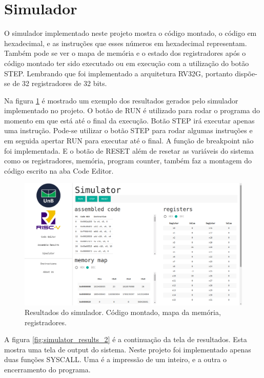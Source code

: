 \section{Simulador}

	O simulador implementado neste projeto mostra o código montado, o código em hexadecimal, e as instruções que esses números em hexadecimal representam. Também pode se ver o mapa de memória e o estado dos registradores após o código montado ter sido executado ou em execução com a utilização do botão STEP.  Lembrando que foi implementado a arquitetura RV32G, portanto dispõe-se de 32 registradores de 32 bits.

	Na figura \ref{fig:simulator_results_1} é mostrado um exemplo dos resultados gerados pelo simulador implementado no projeto. O botão de RUN é utilizado para rodar o programa do momento em que está até o final da execução. Botão STEP irá executar apenas uma instrução. Pode-se utilizar o botão STEP para rodar algumas instruções e em seguida apertar RUN para executar até o final. A função de breakpoint não foi implementada. E o botão de RESET além de resetar as variáveis do sistema como os registradores, memória, program counter, também faz a montagem do código escrito na aba Code Editor.

	\begin{figure}[h!]
	  \includegraphics[width=\linewidth]{img/simulator_results_1.png}
	  \caption{Resultados do simulador. Código montado, mapa da memória, registradores. }
	  \label{fig:simulator_results_1}
	\end{figure}

	A figura \ref{fig:simulator_results_2} é a continuação da tela de resultados. Esta mostra uma tela de output do sistema. Neste projeto foi implementado apenas duas funções SYSCALL. Uma é a impressão de um inteiro, e a outra o encerramento do programa.  


